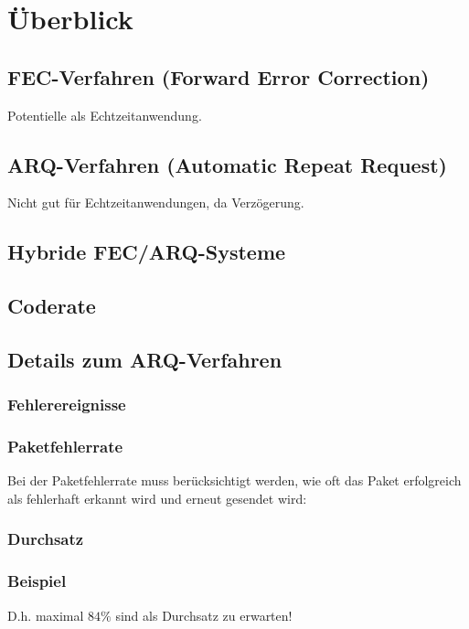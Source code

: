 \section{Überblick}
\subsection{FEC-Verfahren (Forward Error Correction)}
Potentielle als Echtzeitanwendung.

\subsection{ARQ-Verfahren (Automatic Repeat Request)}
Nicht gut für Echtzeitanwendungen, da Verzögerung.

\subsection{Hybride FEC/ARQ-Systeme}

\subsection{Coderate}

\subsection{Details zum ARQ-Verfahren}
\subsubsection{Fehlerereignisse}
\subsubsection{Paketfehlerrate}
Bei der Paketfehlerrate muss berücksichtigt werden, wie oft das Paket erfolgreich als fehlerhaft erkannt wird und erneut gesendet wird:
\subsubsection{Durchsatz}
\subsubsection{Beispiel}
D.h. maximal $84\%$ sind als Durchsatz zu erwarten!
